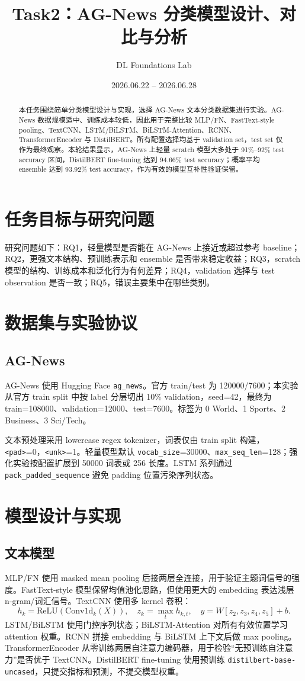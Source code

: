 \documentclass[UTF8,a4paper,11pt]{ctexart}
\title{Task2：AG-News 分类模型设计、对比与分析}
\author{DL Foundations Lab}
\date{2026.06.22 -- 2026.06.28}
\begin{document}
\maketitle

\begin{abstract}
本任务围绕简单分类模型设计与实现，选择 AG-News 文本分类数据集进行实验。AG-News 数据规模适中、训练成本较低，因此用于完整比较 MLP/FN、FastText-style pooling、TextCNN、LSTM/BiLSTM、BiLSTM-Attention、RCNN、TransformerEncoder 与 DistilBERT。所有配置选择均基于 validation set，test set 仅作为最终观察。本轮结果显示，AG-News 上轻量 scratch 模型大多处于 91\%--92\% test accuracy 区间，DistilBERT fine-tuning 达到 94.66\% test accuracy；概率平均 ensemble 达到 93.92\% test accuracy，作为有效的模型互补性验证保留。
\end{abstract}

\section{任务目标与研究问题}
研究问题如下：RQ1，轻量模型是否能在 AG-News 上接近或超过参考 baseline；RQ2，更强文本结构、预训练表示和 ensemble 是否带来稳定收益；RQ3，scratch 模型的结构、训练成本和泛化行为有何差异；RQ4，validation 选择与 test observation 是否一致；RQ5，错误主要集中在哪些类别。

\section{数据集与实验协议}
\subsection{AG-News}
AG-News 使用 Hugging Face \texttt{ag\_news}。官方 train/test 为 120000/7600；本实验从官方 train split 中按 label 分层切出 10\% validation，seed=42，最终为 train=108000、validation=12000、test=7600。标签为 0 World、1 Sports、2 Business、3 Sci/Tech。

文本预处理采用 lowercase regex tokenizer，词表仅由 train split 构建，\texttt{<pad>}=0，\texttt{<unk>}=1。轻量模型默认 \texttt{vocab\_size}=30000、\texttt{max\_seq\_len}=128；强化实验按配置扩展到 50000 词表或 256 长度。LSTM 系列通过 \texttt{pack\_padded\_sequence} 避免 padding 位置污染序列状态。

\section{模型设计与实现}
\subsection{文本模型}
MLP/FN 使用 masked mean pooling 后接两层全连接，用于验证主题词信号的强度。FastText-style 模型保留均值池化思路，但使用更大的 embedding 表达浅层 n-gram/词汇信号。TextCNN 使用多 kernel 卷积：
\[
h_k=\mathrm{ReLU}(\mathrm{Conv1d}_k(X)), \quad z_k=\max_t h_{k,t}, \quad y=W[z_2,z_3,z_4,z_5]+b .
\]
LSTM/BiLSTM 使用门控序列状态；BiLSTM-Attention 对所有有效位置学习 attention 权重。RCNN 拼接 embedding 与 BiLSTM 上下文后做 max pooling。TransformerEncoder 从零训练两层自注意力编码器，用于检验“无预训练自注意力”是否优于 TextCNN。DistilBERT fine-tuning 使用预训练 \texttt{distilbert-base-uncased}，只提交指标和预测，不提交模型权重。
\end{document}
